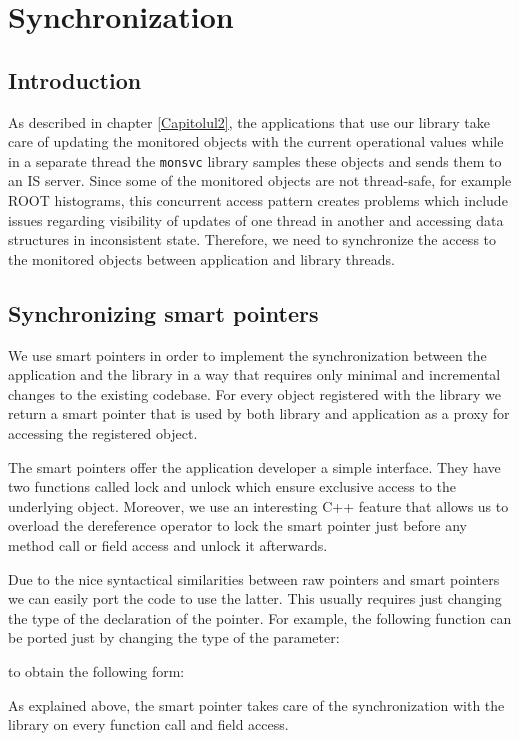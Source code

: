 \chapter{Synchronization} %
\label{Capitolul5}

\section{Introduction}

As described in chapter \ref{Capitolul2}, the applications that use our library take care of updating the monitored objects with the current operational values while in a separate thread the {\tt monsvc} library samples these objects and sends them to an IS server. Since some of the monitored objects are not thread-safe, for example ROOT histograms, this concurrent access pattern creates problems which include issues regarding visibility of updates of one thread in another and accessing data structures in inconsistent state. Therefore, we need to synchronize the access to the monitored objects between application and library threads.

\section{Synchronizing smart pointers}

We use smart pointers in order to implement the synchronization between the application and the library in a way that requires only minimal and incremental changes to the existing codebase. For every object registered with the library we return a smart pointer that is used by both library and application as a proxy for accessing the registered object. 

The smart pointers offer the application developer a simple interface. They have two functions called lock and unlock which ensure exclusive access to the underlying object. Moreover, we use an interesting C++ feature \citep{andrei2001modern} that allows us to overload the dereference operator to lock the smart pointer just before any method call or field access and unlock it afterwards.

Due to the nice syntactical similarities between raw pointers and smart pointers we can easily port the code to use the latter. This usually requires just changing the type of the declaration of the pointer. For example, the following function can be ported just by changing the type of the parameter:

to obtain the following form:

As explained above, the smart pointer takes care of the synchronization with the library on every function call and field access.

